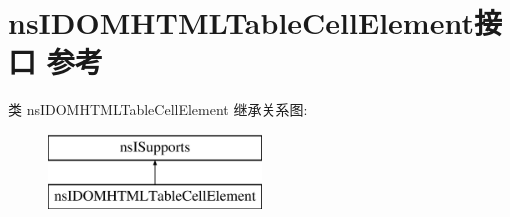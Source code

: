\hypertarget{interfacens_i_d_o_m_h_t_m_l_table_cell_element}{}\section{ns\+I\+D\+O\+M\+H\+T\+M\+L\+Table\+Cell\+Element接口 参考}
\label{interfacens_i_d_o_m_h_t_m_l_table_cell_element}
类 ns\+I\+D\+O\+M\+H\+T\+M\+L\+Table\+Cell\+Element 继承关系图\+:\begin{figure}[H]
\begin{center}
\leavevmode
\includegraphics[height=2.000000cm]{interfacens_i_d_o_m_h_t_m_l_table_cell_element}
\end{center}
\end{figure}

